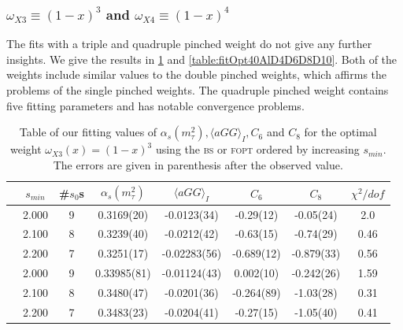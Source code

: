 \documentclass[../../index.tex]{subfiles}
\begin{document}
\subsubsection{\( \omega_{X3} \equiv (1-x)^3\) and \(\omega_{X4} \equiv
  (1-x)^4\)}
The fits with a triple and quadruple pinched weight do not give any further
insights. We give the results in \cref{table:fitOpt30AlD4D6D8} and
\cref{table:fitOpt40AlD4D6D8D10}. Both of the weights include similar values to
the double pinched weights, which affirms the problems of the single pinched
weights. The quadruple pinched weight contains five fitting parameters and has
notable convergence problems.
\begin{table}
  \centering
  \begin{tabular}{cccccccc}
    \toprule
    & \(s_{min}\) & \#\(s_0\)s & \(\alpha_s(m_\tau^2)\) & \(\langle aGG \rangle_I\) & \(C_{6}\) & \(C_{8}\) & \(\chi^2/dof\)  \\
    \midrule
    \parbox[t]{2mm}{}
    & 2.000 & 9 & 0.3169(20) & -0.0123(34) & -0.29(12) & -0.05(24) & 2.0 \\
    & 2.100 & 8 & 0.3239(40) & -0.0212(42) & -0.63(15) & -0.74(29) & 0.46 \\
    & 2.200 & 7 & 0.3251(17) & -0.02283(56) & -0.689(12) & -0.879(33) & 0.56 \\
    \midrule
    \parbox[t]{2mm}{}
    & 2.000 & 9  & 0.33985(81) & -0.01124(43) & 0.002(10) & -0.242(26) & 1.59 \\
    & 2.100 & 8  & 0.3480(47) & -0.0201(36) & -0.264(89) & -1.03(28) & 0.31 \\
    & 2.200 & 7  & 0.3483(23) & -0.0204(41) & -0.27(15) & -1.05(40) & 0.41 \\
    \bottomrule
  \end{tabular}
  \caption{Table of our fitting values of \(\alpha_s(m_\tau^2), \langle aGG
    \rangle_I, C_6\) and \(C_{8}\) for the optimal weight
    \(\omega_{X3}(x)=(1-x)^3\) using the \textsc{bs} or \textsc{fopt} ordered by
    increasing \(s_{min}\). The errors are given in parenthesis after the
    observed value.}
  \label{table:fitOpt30AlD4D6D8}
\end{table}
\end{document}
